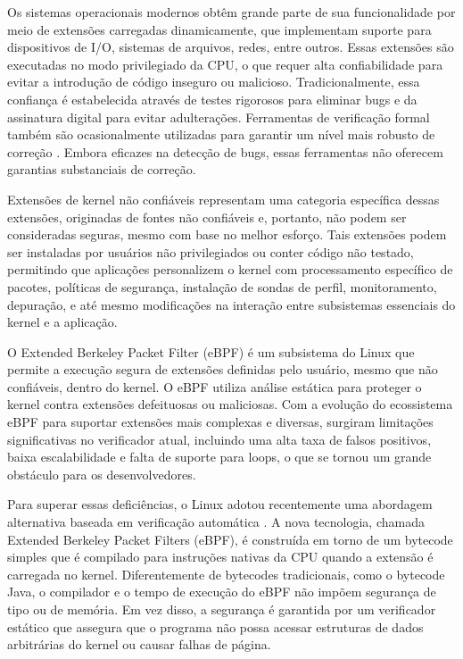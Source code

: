 \documentclass[sigconf]{acmart}
\begin{document}
Os sistemas operacionais modernos obtêm grande parte de sua funcionalidade por meio de extensões carregadas dinamicamente, que implementam suporte para dispositivos de I/O, sistemas de arquivos, redes, entre outros. Essas extensões são executadas no modo privilegiado da CPU, o que requer alta confiabilidade para evitar a introdução de código inseguro ou malicioso. Tradicionalmente, essa confiança é estabelecida através de testes rigorosos para eliminar bugs e da assinatura digital para evitar adulterações. Ferramentas de verificação formal também são ocasionalmente utilizadas para garantir um nível mais robusto de correção \cite{gurfinkel2015seahorn} \cite{ball2006thorough}. Embora eficazes na detecção de bugs, essas ferramentas não oferecem garantias substanciais de correção.

Extensões de kernel não confiáveis representam uma categoria específica dessas extensões, originadas de fontes não confiáveis e, portanto, não podem ser consideradas seguras, mesmo com base no melhor esforço. Tais extensões podem ser instaladas por usuários não privilegiados ou conter código não testado, permitindo que aplicações personalizem o kernel com processamento específico de pacotes, políticas de segurança, instalação de sondas de perfil, monitoramento, depuração, e até mesmo modificações na interação entre subsistemas essenciais do kernel e a aplicação.

O Extended Berkeley Packet Filter (eBPF) é um subsistema do Linux que permite a execução segura de extensões definidas pelo usuário, mesmo que não confiáveis, dentro do kernel. O eBPF utiliza análise estática para proteger o kernel contra extensões defeituosas ou maliciosas. Com a evolução do ecossistema eBPF para suportar extensões mais complexas e diversas, surgiram limitações significativas no verificador atual, incluindo uma alta taxa de falsos positivos, baixa escalabilidade e falta de suporte para loops, o que se tornou um grande obstáculo para os desenvolvedores.

Para superar essas deficiências, o Linux adotou recentemente uma abordagem alternativa baseada em verificação automática \cite{schulist2018linux}. A nova tecnologia, chamada Extended Berkeley Packet Filters (eBPF), é construída em torno de um bytecode simples que é compilado para instruções nativas da CPU quando a extensão é carregada no kernel. Diferentemente de bytecodes tradicionais, como o bytecode Java, o compilador e o tempo de execução do eBPF não impõem segurança de tipo ou de memória. Em vez disso, a segurança é garantida por um verificador estático que assegura que o programa não possa acessar estruturas de dados arbitrárias do kernel ou causar falhas de página.
\end{document}
